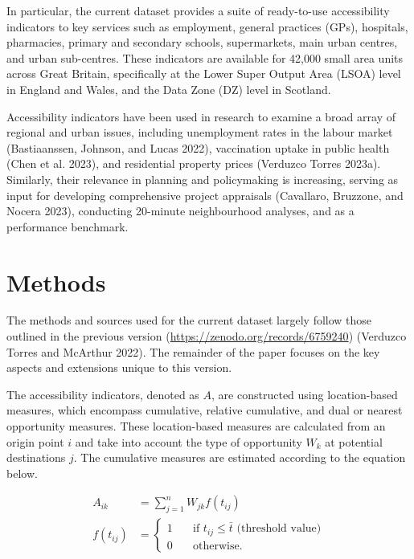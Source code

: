 \documentclass{article}
\begin{document}
In particular, the current dataset provides a suite of ready-to-use
accessibility indicators to key services such as employment, general
practices (GPs), hospitals, pharmacies, primary and secondary schools,
supermarkets, main urban centres, and urban sub-centres. These
indicators are available for 42,000 small area units across Great
Britain, specifically at the Lower Super Output Area (LSOA) level in
England and Wales, and the Data Zone (DZ) level in Scotland.

Accessibility indicators have been used in research to examine a broad
array of regional and urban issues, including unemployment rates in the
labour market (Bastiaanssen, Johnson, and Lucas 2022), vaccination
uptake in public health (Chen et al. 2023), and residential property
prices (Verduzco Torres 2023a). Similarly, their relevance in planning
and policymaking is increasing, serving as input for developing
comprehensive project appraisals (Cavallaro, Bruzzone, and Nocera 2023),
conducting 20-minute neighbourhood analyses, and as a performance
benchmark.

\hypertarget{methods}{%
\section{Methods}\label{methods}}

The methods and sources used for the current dataset largely follow
those outlined in the previous version
(\url{https://zenodo.org/records/6759240}) (Verduzco Torres and McArthur
2022). The remainder of the paper focuses on the key aspects and
extensions unique to this version.

The accessibility indicators, denoted as \(A\), are constructed using
location-based measures, which encompass cumulative, relative
cumulative, and dual or nearest opportunity measures. These
location-based measures are calculated from an origin point \(i\) and
take into account the type of opportunity \(W_k\) at potential
destinations \(j\). The cumulative measures are estimated according to
the equation below.

\[
\begin{aligned}
A_{ik} &= \sum_{j=1}^{n} W_{jk} f(t_{ij}) \\
f(t_{ij}) &= \left\{
      \begin{array}{ll}
          1 & \quad \text{if }t_{ij} \leq \bar{t} \text{ (threshold value)} \\
          0 & \quad \text{otherwise}.
      \end{array}
    \right.
\end{aligned}
\]
\end{document}
